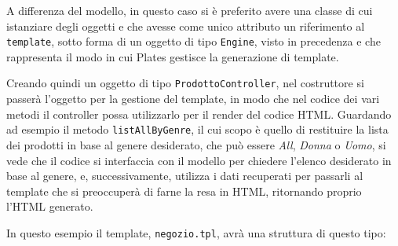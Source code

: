 A differenza del modello, in questo caso si è preferito avere una classe
di cui istanziare degli oggetti e che avesse come unico attributo un
riferimento al \texttt{template}, sotto forma di un oggetto di tipo
\texttt{Engine}, visto in precedenza e che rappresenta il modo in cui
Plates gestisce la generazione di template.

Creando quindi un oggetto di tipo \texttt{ProdottoController}, nel
costruttore si passerà l'oggetto per la gestione del template, in modo
che nel codice dei vari metodi il controller possa utilizzarlo per il
render del codice HTML. Guardando ad esempio il metodo
\texttt{listAllByGenre}, il cui scopo è quello di restituire la lista
dei prodotti in base al genere desiderato, che può essere \emph{All},
\emph{Donna} o \emph{Uomo}, si vede che il codice si interfaccia con il
modello per chiedere l'elenco desiderato in base al genere, e,
successivamente, utilizza i dati recuperati per passarli al template che
si preoccuperà di farne la resa in HTML, ritornando proprio l'HTML
generato.

In questo esempio il template, \texttt{negozio.tpl}, avrà una struttura
di questo tipo:


